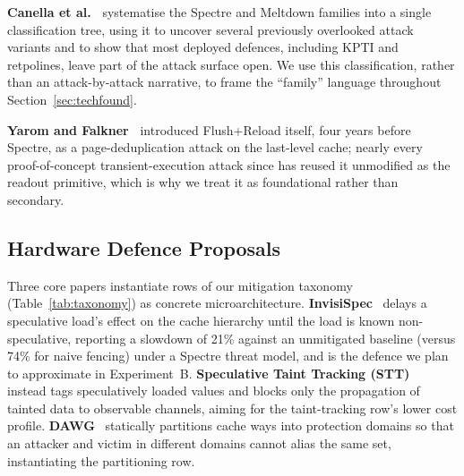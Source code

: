 \documentclass[11pt,a4paper]{article}
\begin{document}
\textbf{Canella et al.~\cite{canella2019systematic}} systematise the
Spectre and Meltdown families into a single classification tree, using it to
uncover several previously overlooked attack variants and to show that most
deployed defences, including KPTI and retpolines, leave part of the attack
surface open. We use this classification, rather than an attack-by-attack
narrative, to frame the ``family'' language throughout Section~\ref{sec:techfound}.

\textbf{Yarom and Falkner~\cite{yarom2014flushreload}} introduced Flush+Reload
itself, four years before Spectre, as a page-deduplication attack on the
last-level cache; nearly every proof-of-concept transient-execution attack
since has reused it unmodified as the readout primitive, which is why we treat
it as foundational rather than secondary.

\subsection{Hardware Defence Proposals}

Three core papers instantiate rows of our mitigation taxonomy
(Table~\ref{tab:taxonomy}) as concrete microarchitecture.
\textbf{InvisiSpec}~\cite{yan2018invisispec} delays a speculative load's effect
on the cache hierarchy until the load is known non-speculative, reporting a
slowdown of 21\% against an unmitigated baseline (versus 74\% for naive fencing)
under a Spectre threat model, and is the defence we plan to approximate in
Experiment~B. \textbf{Speculative Taint Tracking (STT)}~\cite{yu2019stt} instead
tags speculatively loaded values and blocks only the propagation of tainted data
to observable channels, aiming for the taint-tracking row's lower cost profile.
\textbf{DAWG}~\cite{kiriansky2018dawg} statically partitions cache ways into
protection domains so that an attacker and victim in different domains cannot
alias the same set, instantiating the partitioning row.
\end{document}
